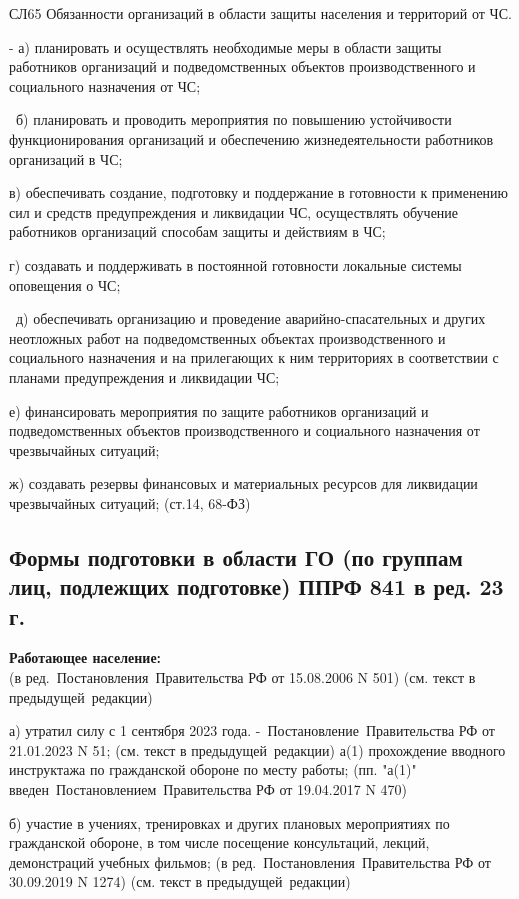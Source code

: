 \documentclass[a4paper, 12pt]{article}
\theoremstyle{definition}
\begin{document}
        СЛ65    Обязанности организаций в области защиты населения и территорий от ЧС.
        
        - а) планировать и осуществлять необходимые меры в области защиты работников организаций и подведомственных объектов производственного и социального назначения от  ЧС;
        
         б) планировать и проводить мероприятия по повышению устойчивости\\ функционирования организаций и обеспечению жизнедеятельности работников организаций в ЧС;
        
        в) обеспечивать создание, подготовку и поддержание в готовности к применению сил и средств предупреждения и ликвидации ЧС, осуществлять обучение работников организаций способам защиты и действиям в ЧС;
        
        г) создавать и поддерживать в постоянной готовности локальные системы оповещения о ЧС;
        
         д) обеспечивать организацию и проведение аварийно-спасательных и других неотложных работ на подведомственных объектах производственного и социального назначения и на прилегающих к ним территориях в соответствии с планами предупреждения и ликвидации ЧС;
        
        е) финансировать мероприятия по защите работников организаций и подведомственных объектов производственного и социального назначения от чрезвычайных ситуаций;
        
        ж) создавать резервы финансовых и материальных ресурсов для ликвидации чрезвычайных ситуаций;  (ст.14, 68-ФЗ)

        \subsection{Формы подготовки в области ГО (по группам лиц, подлежщих подготовке) ППРФ 841 в ред. 23 г.}
        \textbf{Работающее население:}\\
        (в ред. Постановления Правительства РФ от 15.08.2006 N 501)
        (см. текст в предыдущей редакции)
        
        а) утратил силу с 1 сентября 2023 года. 
        - Постановление Правительства РФ от 21.01.2023 N 51;
        (см. текст в предыдущей редакции)
        а(1) прохождение вводного инструктажа по гражданской обороне по месту работы;
        (пп. "а(1)" введен Постановлением Правительства РФ от 19.04.2017 N 470)
        
        б) участие в учениях, тренировках и других плановых мероприятиях по гражданской обороне, в том числе посещение консультаций, лекций, демонстраций учебных фильмов;
        (в ред. Постановления Правительства РФ от 30.09.2019 N 1274)
        (см. текст в предыдущей редакции)
        
\end{document}
